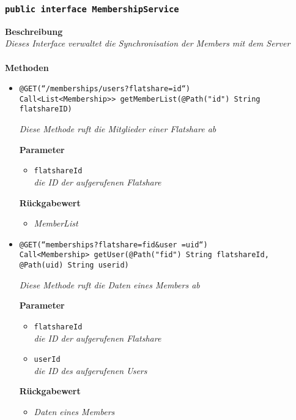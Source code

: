	\subsubsection{\texttt{public interface MembershipService }}
	\textbf{Beschreibung}\\
	\textit{Dieses Interface verwaltet die Synchronisation der Members mit dem Server}\\
\\
	\textbf{Methoden} 
		\begin{itemize}
		\item\texttt{{@GET(``/memberships/users?flatshare={id}``) \\ Call<List<Membership>{}> getMemberList(@Path("id") String flatshareID)}}

		\textit{Diese Methode ruft die Mitglieder einer Flatshare ab}

		\textbf{Parameter} 
			\begin{itemize}
				\item\texttt{flatshareId}\\
		 		\textit{die ID der aufgerufenen Flatshare}
	 		\end{itemize}

		\textbf{Rückgabewert} 
		\begin{itemize}
		\item\textit{MemberList}
		\end{itemize}


      \item\texttt{{@GET(``memberships?flatshare={fid}\&user ={uid}``)\\Call<Membership> getUser(@Path("fid") String flatshareId, @Path(\grqq uid\grqq) String userid)}}

		\textit{Diese Methode ruft die Daten eines Members ab}        	

		\textbf{Parameter} 
			\begin{itemize}
				\item\texttt{flatshareId}\\
		 		\textit{die ID der aufgerufenen Flatshare}
		 		\item\texttt{userId}\\
		 		\textit{die ID des aufgerufenen Users}
	 		\end{itemize}

		\textbf{Rückgabewert} 
		\begin{itemize}
		\item\textit{Daten eines Members}
		\end{itemize}



\end{itemize}
